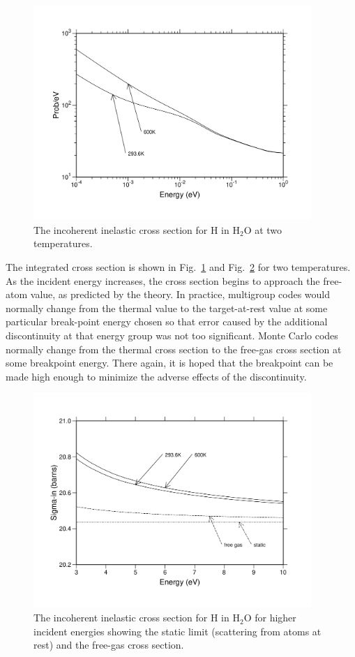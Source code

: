\begin{figure}[b]\centering
\includegraphics[keepaspectratio, height=3.2in, angle=0]{figs/hh2o-in1ack}
\caption[The incoherent inelastic cross section for H in H$_2$O at two
 temperatures]{The incoherent inelastic cross section for H in H$_2$O
 at two temperatures.}
\label{hh2o-in1}
\end{figure}

The integrated cross section is shown in Fig.~\ref{hh2o-in1} and
Fig.~\ref{hh2o-in2} for two temperatures. As the incident energy
increases, the cross section begins to approach the free-atom value,
as predicted by the theory. In practice, multigroup codes would
normally change from the thermal value to the target-at-rest value
at some particular break-point energy chosen so that error caused
by the additional discontinuity at that energy group was not too
significant. Monte Carlo codes normally change from the thermal
cross section to the free-gas cross section at some breakpoint
energy. There again, it is hoped that the breakpoint can be made
high enough to minimize the adverse effects of the discontinuity.

\begin{figure}[t]\centering
\includegraphics[keepaspectratio, height=3.2in, angle=0]{figs/hh2o-in2ack}
\caption[The incoherent inelastic cross section for H in H$_2$O for higher
 incident energies]{The incoherent inelastic cross section for H in H$_2$O for
 higher incident energies showing the static limit (scattering from atoms at
 rest) and the free-gas cross section.}
\label{hh2o-in2}
\end{figure}

